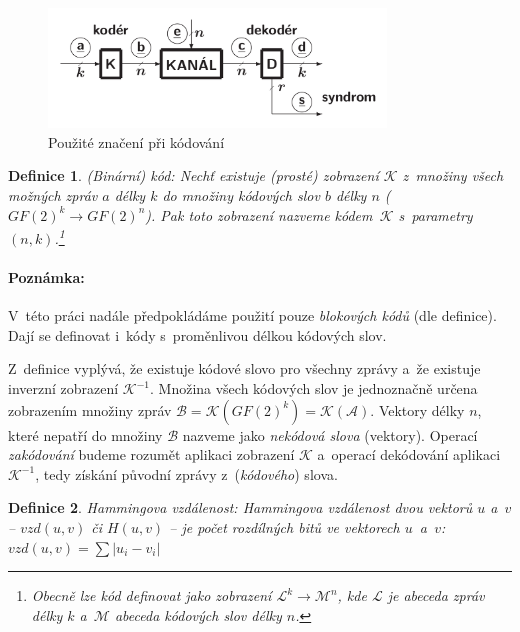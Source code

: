 \documentclass[thesis=M,czech,hidelinks]{FITthesis}[2012/06/26]
\newcommand{\0}{{\textcolor[gray]{0.75}{0}}}
\newtheorem{definice}{Definice}
\begin{document}
\begin{figure}
    \centering
    \includegraphics[width=0.8\textwidth]{materialy/aak-kodovani.png}
    \caption{Použité značení při kódování~\cite{FIT_AAK}}
    \label{obr_kodovani}
\end{figure}


\begin{definice}{(Binární) kód:}
    Nechť existuje (prosté) zobrazení $\mathcal{K}$ z~množiny všech možných
    zpráv $a$ délky $k$ do množiny kódových slov $b$ délky $n$
    ($GF(2)^k \rightarrow GF(2)^n$). Pak toto zobrazení nazveme
    kódem~$\mathcal{K}$ s~parametry $(n,k)$.\footnote{
        Obecně lze \emph{kód} definovat jako zobrazení $\mathcal{L}^k
        \rightarrow \mathcal{M}^n$, kde $\mathcal{L}$ je \emph{abeceda} zpráv
        délky $k$ a~$\mathcal{M}$ abeceda kódových slov délky $n$.
    }
\end{definice}

\paragraph{Poznámka:} V~této práci nadále předpokládáme použití pouze
\emph{blokových kódů} (dle definice). Dají se definovat i~kódy s~proměnlivou
délkou kódových slov.

Z~definice vyplývá, že existuje kódové slovo pro všechny zprávy a~že existuje
inverzní zobrazení $\mathcal{K}^{-1}$. Množina všech kódových slov je
jednoznačně určena zobrazením množiny zpráv $\mathcal{B} =
\mathcal{K}(GF(2)^k) = \mathcal{K}(\mathcal{A})$. Vektory délky $n$, které
nepatří do množiny $\mathcal{B}$ nazveme jako \emph{nekódová slova} (vektory).
Operací \emph{zakódování} budeme rozumět aplikaci zobrazení $\mathcal{K}$
a~operací dekódování aplikaci $\mathcal{K}^{-1}$, tedy získání původní zprávy
z~(\emph{kódového}) slova.

\begin{definice}{Hammingova vzdálenost:}
    \emph{Hammingova vzdálenost} dvou vektorů $u$ a~$v$ -- $vzd(u,v)$ či
    $H(u,v)$ -- je počet rozdílných \emph{bitů} ve vektorech $u$~a~$v$:
    $vzd(u,v) = \sum \left| u_i - v_i \right|$
\end{definice}
\end{document}

